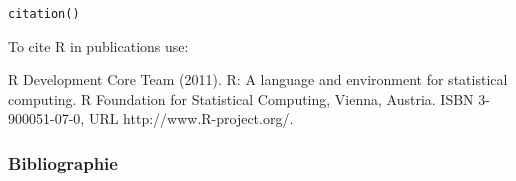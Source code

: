 \documentclass[extsize,handout,10pt]{beamer}\usepackage[]{graphicx}\usepackage[]{color}
\makeatletter
\newcommand{\hlstd}[1]{\textcolor[rgb]{0.251,0.251,0.251}{#1}}%
\newcommand{\hlkwd}[1]{\textcolor[rgb]{0.69,0.188,0.941}{#1}}%
\newenvironment{kframe}{%
 \def\at@end@of@kframe{}%
 \ifinner\ifhmode%
  \def\at@end@of@kframe{\end{minipage}}%
  \begin{minipage}{\columnwidth}%
 \fi\fi%
 \def\FrameCommand##1{\hskip\@totalleftmargin \hskip-\fboxsep
 \colorbox{shadecolor}{##1}\hskip-\fboxsep
     \hskip-\linewidth \hskip-\@totalleftmargin \hskip\columnwidth}%
 \MakeFramed {\advance\hsize-\width
   \@totalleftmargin\z@ \linewidth\hsize
   \@setminipage}}%
 {\par\unskip\endMakeFramed%
 \at@end@of@kframe}
\newenvironment{knitrout}{}{} %
\makeatother
\begin{document}
\begin{frame}

\begin{knitrout}\tiny
{}\color{fgcolor}\begin{kframe}
\begin{alltt}
\hlkwd{citation}\hlstd{()}
\end{alltt}
\end{kframe}
\end{knitrout}

To cite R in publications use:

  R Development Core Team (2011). R: A language and environment for
  statistical computing. R Foundation for Statistical Computing,
  Vienna, Austria. ISBN 3-900051-07-0, URL http://www.R-project.org/.
  
\end{frame}







\begin{frame}
  \frametitle{Bibliographie}




\nocite{*}

  


\end{frame}
\end{document}
